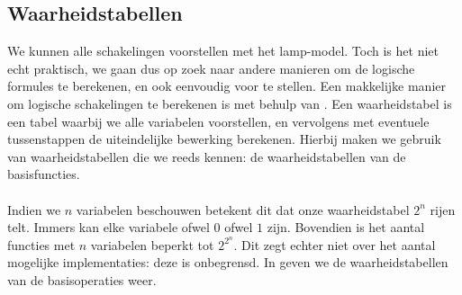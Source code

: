 \subsection{Waarheidstabellen}
We kunnen alle schakelingen voorstellen met het lamp-model. Toch is het niet echt praktisch, we gaan dus op zoek naar andere manieren om de logische formules te berekenen, en ook eenvoudig voor te stellen. Een makkelijke manier om logische schakelingen te berekenen is met behulp van . Een waarheidstabel is een tabel waarbij we alle variabelen voorstellen, en vervolgens met eventuele tussenstappen de uiteindelijke bewerking berekenen. Hierbij maken we gebruik van waarheidstabellen die we reeds kennen: de waarheidstabellen van de basisfuncties.

\paragraph{}
Indien we $n$ variabelen beschouwen betekent dit dat onze waarheidstabel $2^n$ rijen telt. Immers kan elke variabele ofwel $0$ ofwel $1$ zijn. Bovendien is het aantal functies met $n$ variabelen beperkt tot $2^{2^n}$. Dit zegt echter niet over het aantal mogelijke implementaties: deze is onbegrensd. In  geven we de waarheidstabellen van de basisoperaties weer.
\begin{table}[htb]
\centering
{}
\caption{Waarheidstabellen van de basisoperaties.}
\label{tbl:truthTablesBasicGates}
\end{table}
